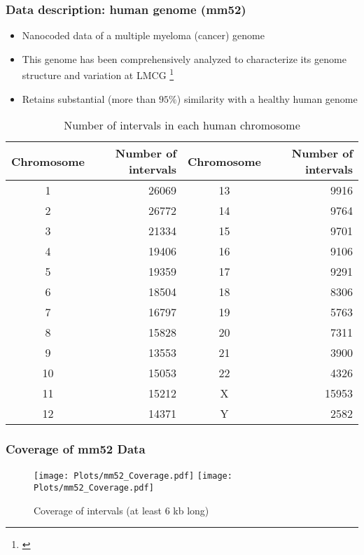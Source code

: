 \documentclass[10pt,dvipsnames,table]{beamer}
\begin{document}
\begin{frame}
\frametitle{Data description: human genome (mm52)}
\begin{itemize}
\footnotesize
\item Nanocoded data of a multiple myeloma (cancer) genome
\item This genome has been comprehensively analyzed to characterize its genome structure and variation at LMCG \footnote{\cite{Gupta_etal_2015_PNAS}}
\item Retains substantial (more than $95\%$) similarity with a healthy human genome
\end{itemize}

\begin{table}[H]
\footnotesize
\centering
\begin{tabular}{c | r || c | r}
  \hline
  \hline
  Chromosome & Number of intervals & Chromosome & Number of intervals \\ 
  \hline
  1 & 26069  & 13 & 9916 \\
  2 & 26772  & 14 & 9764 \\
  3 & 21334  & 15 & 9701 \\
  4 & 19406  & 16 & 9106 \\
  5 & 19359  & 17 & 9291 \\
  6 & 18504  & 18 & 8306 \\
  7 & 16797  & 19 & 5763 \\
  8 & 15828  & 20 & 7311 \\
  9 & 13553  & 21 & 3900 \\
  10 & 15053  & 22 & 4326 \\
  11 & 15212  & X & 15953 \\
  12 & 14371  & Y & 2582 \\
  \hline
  \hline
\end{tabular}
\caption{Number of intervals in each human chromosome}
\label{tab:mm52intervals}
\end{table}

\end{frame}

\begin{frame}
\frametitle{Coverage of mm52 Data}
\begin{figure}[H]
\begin{center}
\texttt{[image: Plots/mm52\_Coverage.pdf]}
\texttt{[image: Plots/mm52\_Coverage.pdf]}
\end{center}
\caption{Coverage of intervals (at least 6 kb long)}
\label{fig:Coverage_mm1}
\end{figure}

\end{frame}
\end{document}

